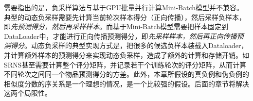 需要指出的是，负采样算法与基于GPU批量并行计算Mini-Batch模型并不兼容。典型的动态负采样需要先计算当前轮次样本得分（正向传播），然后采样负样本，即\textit{先预测得分，然后再采样样本}。而基于Mini-Batch模型需要把样本固定到DataLoader中，才能进行正向传播预测得分，即\textit{先采样样本，然后再正向传播预测得分}。动态负采样的典型实现方式是，把很多的候选负样本装载入Dataloader，并计算额外样本的预测得分来实现动态负采样，造成了额外的计算和存储开销。如SRNS\cite{Ding:2020:NIPS}甚至需要计算整个评分矩阵，并记录若干个训练轮次的评分矩阵，从而计算不同轮次之间同一个物品预测得分的方差。此外，本章所假设的真负例和伪负例的相似度分数的序关系是一个理想的情况，是一个比较强的假设。后面的章节将解决这两个局限性。
